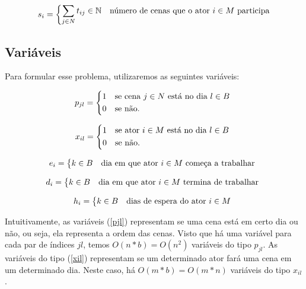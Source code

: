 \documentclass[a4paper,11pt]{article}
\begin{document}
\begin{equation}
  s_{i} = \begin{dcases*} \sum_{j \in N} t_{ij} \in \mathbb{N} & número de cenas que o ator $i \in M$ participa\end{dcases*}
\end{equation}

\subsection{Variáveis}
Para formular esse problema, utilizaremos as seguintes variáveis:

\begin{equation}
  p_{jl} = \begin{dcases*}
              1 & se cena $j \in N$ está no dia $l \in B$ \\
              0 & se não.
           \end{dcases*}
  \label{pjl}
\end{equation}

\begin{equation}
  x_{il} = \begin{dcases*}
              1 & se ator $i \in M$ está no dia $l \in B$ \\
              0 & se não.
           \end{dcases*}
  \label{xil}
\end{equation}

\begin{equation}
  e_{i} = \begin{dcases*} k \in B & dia em que ator $i \in M$ começa a trabalhar \end{dcases*}
  \label{ei}
\end{equation}

\begin{equation}
  d_{i} = \begin{dcases*} k \in B & dia em que ator $i \in M$ termina de trabalhar \end{dcases*}
  \label{di}
\end{equation}

\begin{equation}
  h_{i} = \begin{dcases*} k \in B & dias de espera do ator $i \in M$ \end{dcases*}
  \label{hi}
\end{equation}

Intuitivamente, as variáveis (\ref{pjl}) representam se uma cena está em certo dia
ou não, ou seja, ela representa a ordem das cenas. Visto que há uma variável para
cada par de índices $jl$, temos $O(n*b) = O(n^2)$ variáveis do tipo $p_{jl}$. As
variáveis do tipo (\ref{xil}) representam se um determinado ator fará uma cena
em um determinado dia. Neste caso, há $O(m*b) = O(m*n)$ variáveis do tipo $x_{il}$.
\end{document}
